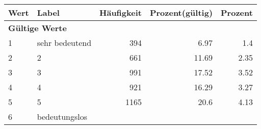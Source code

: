      \begin{longtable}{lXrrr}
     \toprule
     \textbf{Wert} & \textbf{Label} & \textbf{Häufigkeit} & \textbf{Prozent(gültig)} & \textbf{Prozent} \\
     \endhead
     \midrule
     \multicolumn{5}{l}{\textbf{Gültige Werte}}\\

     1 &
     \multicolumn{1}{X}{ sehr bedeutend   } &


       \num{394} &
       \num[round-mode=places,round-precision=2]{6,97} &
         \num[round-mode=places,round-precision=2]{1,4} \\

     2 &
     \multicolumn{1}{X}{ 2   } &


       \num{661} &
       \num[round-mode=places,round-precision=2]{11,69} &
         \num[round-mode=places,round-precision=2]{2,35} \\

     3 &
     \multicolumn{1}{X}{ 3   } &


       \num{991} &
       \num[round-mode=places,round-precision=2]{17,52} &
         \num[round-mode=places,round-precision=2]{3,52} \\

     4 &
     \multicolumn{1}{X}{ 4   } &


       \num{921} &
       \num[round-mode=places,round-precision=2]{16,29} &
         \num[round-mode=places,round-precision=2]{3,27} \\

     5 &
     \multicolumn{1}{X}{ 5   } &


       \num{1165} &
       \num[round-mode=places,round-precision=2]{20,6} &
         \num[round-mode=places,round-precision=2]{4,13} \\

     6 &
     \multicolumn{1}{X}{ bedeutungslos   } &



\end{longtable}
